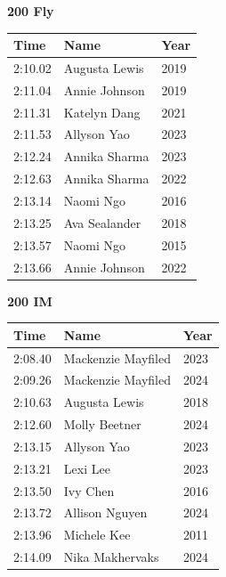 \vspace{1.2em}
\noindent\begin{minipage}[t]{0.48\textwidth}
\centering
\textbf{\textcolor{teamprimary}{200 Fly}}\par
\vspace{0.5em}
\centering
\small
\renewcommand{\arraystretch}{1.0}
\setlength{\tabcolsep}{4pt}
\begin{tabular}{@{}p{1.8cm}p{3.0cm}p{1.0cm}@{}}
\toprule
\textbf{Time} & \textbf{Name} & \textbf{Year} \\
\midrule
2:10.02 & Augusta Lewis & 2019 \\
2:11.04 & Annie Johnson & 2019 \\
2:11.31 & Katelyn Dang & 2021 \\
2:11.53 & Allyson Yao & 2023 \\
2:12.24 & Annika Sharma & 2023 \\
2:12.63 & Annika Sharma & 2022 \\
2:13.14 & Naomi Ngo & 2016 \\
2:13.25 & Ava Sealander & 2018 \\
2:13.57 & Naomi Ngo & 2015 \\
2:13.66 & Annie Johnson & 2022 \\
\bottomrule
\end{tabular}
\end{minipage}
\hfill
\begin{minipage}[t]{0.48\textwidth}
\centering
\textbf{\textcolor{teamprimary}{200 IM}}\par
\vspace{0.5em}
\centering
\small
\renewcommand{\arraystretch}{1.0}
\setlength{\tabcolsep}{4pt}
\begin{tabular}{@{}p{1.8cm}p{3.0cm}p{1.0cm}@{}}
\toprule
\textbf{Time} & \textbf{Name} & \textbf{Year} \\
\midrule
2:08.40 & Mackenzie Mayfiled & 2023 \\
2:09.26 & Mackenzie Mayfiled & 2024 \\
2:10.63 & Augusta Lewis & 2018 \\
2:12.60 & Molly Beetner & 2024 \\
2:13.15 & Allyson Yao & 2023 \\
2:13.21 & Lexi Lee & 2023 \\
2:13.50 & Ivy Chen & 2016 \\
2:13.72 & Allison Nguyen & 2024 \\
2:13.96 & Michele Kee & 2011 \\
2:14.09 & Nika Makhervaks & 2024 \\
\bottomrule
\end{tabular}
\end{minipage}
